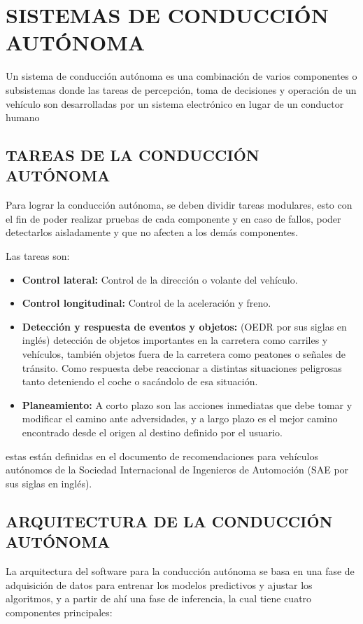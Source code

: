 \section{SISTEMAS DE CONDUCCIÓN AUTÓNOMA}
    Un sistema de conducción autónoma es una combinación de varios componentes o subsistemas donde las tareas de percepción, toma de decisiones y operación de un vehículo son desarrolladas por un sistema electrónico en lugar de un conductor humano
    \subsection{TAREAS DE LA CONDUCCIÓN AUTÓNOMA}
    Para lograr la conducción autónoma, se deben dividir tareas modulares, esto con el fin de poder realizar pruebas de cada componente y en caso de fallos, poder detectarlos aisladamente y que no afecten a los demás componentes.
    
    Las tareas son:
    \begin{itemize}[nosep]
        \item \textbf{Control lateral:} Control de la dirección o volante del vehículo.
        \item \textbf{Control longitudinal:} Control de la aceleración y freno.
        \item \textbf{Detección y respuesta de eventos y objetos:} (OEDR por sus siglas en inglés) detección de objetos importantes en la carretera como carriles y vehículos, también objetos fuera de la carretera como peatones o señales de tránsito. Como respuesta debe reaccionar a distintas situaciones peligrosas tanto deteniendo el coche o sacándolo de esa situación.
        \item \textbf{Planeamiento:} A corto plazo son las acciones inmediatas que debe tomar y modificar el camino ante adversidades, y a largo plazo es el mejor camino encontrado desde el origen al destino definido por el usuario.
    \end{itemize}
    estas están definidas en el documento de recomendaciones para vehículos autónomos de la Sociedad Internacional de Ingenieros de Automoción (SAE por sus siglas en inglés). \citep{J3016_201806}
    \subsection{ARQUITECTURA DE LA CONDUCCIÓN AUTÓNOMA}
    La arquitectura del software para la conducción autónoma se basa en una fase de adquisición de datos para entrenar los modelos predictivos y ajustar los algoritmos, y a partir de ahí una fase de inferencia, la cual tiene cuatro componentes principales:
    
